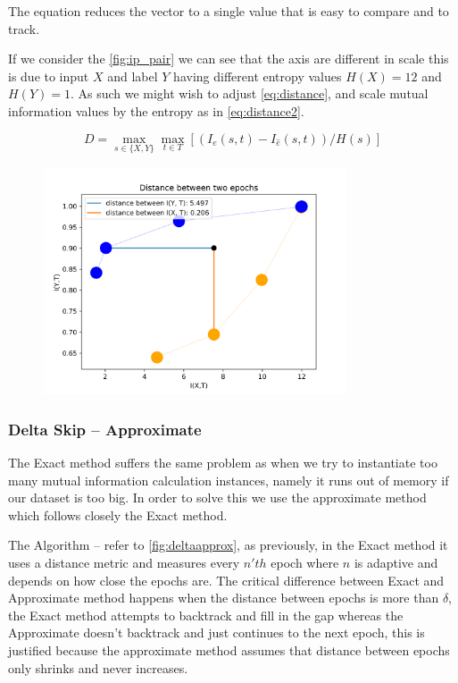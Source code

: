 \documentclass[dissertation.tex]{subfiles}
\begin{document}
  The equation reduces the vector to a single value that is easy to compare and
  to track.

  If we consider the \autoref{fig:ip_pair} we can see that the axis are
  different in scale this is due to input $X$ and label $Y$ having different
  entropy values $ H(X) = 12 $ and $ H(Y) = 1 $. As such we might wish to adjust
  \autoref{eq:distance}, and scale mutual information values by the entropy as
  in \autoref{eq:distance2}.

  \begin{equation}
    D = \max_{s\in\{X, Y\}} \max_{t\in T} [(I_e(s, t) - I_{\hat{e}}(s, t)) / H(s)]
    \label{eq:distance2}
  \end{equation} 

  \begin{figure}[H]
    \centering
    \includegraphics[width=0.80\textwidth]{figs/ip_pair.png}
    \label{fig:ip_pair}
  \end{figure}

\subsubsection{Delta Skip -- Approximate}

  The Exact method suffers the same problem as when we try to instantiate too
  many mutual information calculation instances, namely it runs out of memory if
  our dataset is too big. In order to solve this we use the approximate method
  which follows closely the Exact method. 

  The Algorithm -- refer to \autoref{fig:deltaapprox}, as previously, in the
  Exact method it uses a distance metric and measures every $n'th$ epoch where
  $n$ is adaptive and depends on how close the epochs are. The critical
  difference between Exact and Approximate method happens when the distance
  between epochs is more than $\delta$, the Exact method attempts to backtrack
  and fill in the gap whereas the Approximate doesn't backtrack and just
  continues to the next epoch, this is justified because the approximate method
  assumes that distance between epochs only shrinks and never increases.
\end{document}
